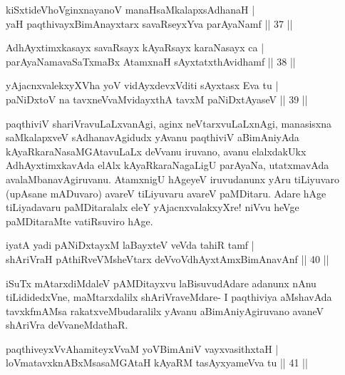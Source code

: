 
\begin{shl}
kiSxtideVhoV\s ginxnayanoV manaHsaMkalapxsAdhanaH |\\
yaH paqthivayxBimAnayxtarx savaRseyxYva parAyaNamf \hfill || 37 ||
\end{shl}

\begin{shl}
AdhAyxtimxkasayx savaRsayx kAyaRsayx karaNasayx ca |\\
parAyaNamavaSaTxmaBx AtamxnaH sAyxtatxthAvidhamf \hfill || 38 ||
\end{shl}

\begin{shl}
yAjacnxvalekxyXVha yoV vidAyxdevxVditi sAyxtasx Eva tu |\\
paNiDxtoV na tavxneVvaMvidayxthA tavxM paNiDxtAyaseV \hfill || 39 ||
\end{shl}

\begin{artha}
paqthiviV shariVravuLaLxvanAgi, aginx neVtarxvuLaLxnAgi, manasisxna saMkalapxveV sAdhanavAgidudx yAvanu paqthiviV aBimAniyAda kAyaRkaraNasaMGAtavuLaLx deVvanu iruvano, avanu elalxdakUkx AdhAyxtimxkavAda elAlx kAyaRkaraNagaLigU parAyaNa, utatxmavAda avalaMbanavAgiruvanu. AtamxnigU hAgeyeV iruvudanunx yAru tiLiyuvaro (upAsane mADuvaro) avareV tiLiyuvaru avareV paMDitaru. Adare hAge tiLiyadavaru paMDitaralalx eleY yAjacnxvalakxyXre! niVvu heVge paMDitaraMte vatiRsuviro hAge.
\end{artha}


\begin{shl}
iyatA yadi pANiDxtayxM laBayxteV veVda tahiR tamf |\\
shAriVraH pAthiRveVM\s sheV\s tarx deVvoV\s dhAyxtAmxBimAnavAnf \hfill || 40 ||
\end{shl}

\begin{artha}
iSuTx mAtarxdiMdaleV pAMDitayxvu laBisuvudAdare adanunx nAnu tiLididedxVne, maMtarxdalilx shAriVraveMdare- I paqthiviya aMshavAda tavxkfmAMsa rakatxveMbudaralilx yAvanu aBimAniyAgiruvano avaneV shAriVra deVvaneMdathaR.
\end{artha}


\begin{shl}
paqthiveyxVvAhamiteyxVvaM yoV\s BimAniV vayxvasithxtaH |\\
loVmatavxknABxMsasaMGAtaH kAyaRM tasAyxyameVva tu \hfill || 41 ||
\end{shl}

